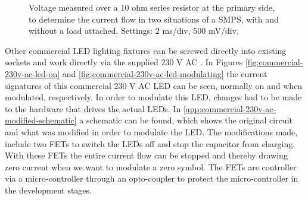 \begin{figure}
	\centering     %

	\caption{Voltage measured over a 10 ohm series resistor at the primary side, to determine the current flow in two situations of a SMPS, with and without a load attached. Settings: 2 ms/div, 500 mV/div.}
\end{figure}



Other commercial LED lighting fixtures can be screwed directly into existing sockets and work directly via the supplied 230 V AC \cite{commercial-230v-ac-led-aliexpress}.
In Figures \ref{fig:commercial-230v-ac-led-on} and \ref{fig:commercial-230v-ac-led-modulating} the current signatures of this commercial 230 V AC LED can be seen, normally on and when modulated, respectively.
In order to modulate this LED, changes had to be made to the hardware that drives the actual LEDs.
In \autoref{app:commercial-230v-ac-modified-schematic} a schematic can be found, which shows the original circuit and what was modified in order to modulate the LED.
The modifications made, include two FETs to switch the LEDs off and stop the capacitor from charging. 
With these FETs the entire current flow can be stopped and thereby drawing zero current when we want to modulate a zero symbol.
The FETs are controller via a micro-controller through an opto-coupler to protect the micro-controller in the development stages.









